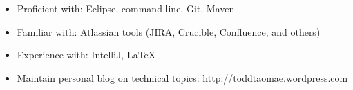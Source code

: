 \documentclass{resume}
\begin{document}
\begin{itemize}
    \item{Proficient with: Eclipse, command line, Git, Maven}
    \item{Familiar with: Atlassian tools (JIRA, Crucible, Confluence, and others)}
    \item{Experience with: IntelliJ, \LaTeX}
\end{itemize}

\begin{itemize}
    \item{Maintain personal blog on technical topics: http://toddtaomae.wordpress.com}
\end{itemize}
\end{document}
